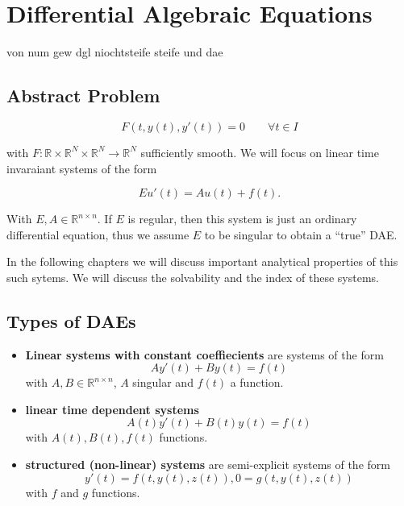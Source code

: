 \chapter{Differential Algebraic Equations}

von num gew dgl niochtsteife steife und dae

\section{Abstract Problem}
\begin{equation}
	\label{Abstract_DAE}
	F(t, y(t), y'(t)) = 0 \qquad \forall t \in I
\end{equation}

with $F:\mathbb{R} \times \mathbb{R}^N \times \mathbb{R}^N \to \mathbb{R}^N$ sufficiently smooth. We will focus on linear time invaraiant systems of the form

\begin{displaymath}
	E u'(t) = A u(t) + f(t).
\end{displaymath}

With $E, A \in \mathbb{R}^{n \times n}$. If $E$ is regular, then this system is just an ordinary differential equation, thus we assume $E$ to be singular to obtain a ``true'' DAE. 

In the following chapters we will discuss important analytical properties of this such sytems. We will discuss the solvability and the index of these systems.

\section{Types of DAEs}

\begin{itemize}
	\item \textbf{Linear systems with constant coeffiecients} \newline
	are systems of the form 
	\begin{equation}
		\label{DAE-const-coeff}
		A y'(t) + B y(t) = f(t)
	\end{equation}
	with $A,B \in \mathbb{R}^{n \times n}$, $A$ singular and $f(t)$ a function.
	\item \textbf{linear time dependent systems}
	\begin{displaymath}
		A(t) y'(t) + B(t) y(t) = f(t)
	\end{displaymath}
	with $A(t),B(t),f(t)$ functions.
	\item  \textbf{structured (non-linear) systems} \newline
	are semi-explicit systems of the form
	\begin{displaymath}
		y'(t) = f(t, y(t), z(t)),
		0 = g(t,y(t),z(t))
	\end{displaymath}
	with $f$ and $g$ functions.
\end{itemize}

